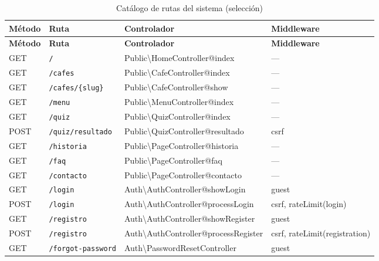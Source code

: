 \documentclass[12pt,a4paper,twoside,openright]{report}
\begin{document}
\begin{landscape}
\begin{longtable}{@{}llll@{}}
  \caption{Catálogo de rutas del sistema (selección)}
  \label{tab:rutas}\\
  \toprule
  \textbf{Método} & \textbf{Ruta} & \textbf{Controlador} & \textbf{Middleware}\\
  \midrule
  \endfirsthead
  \toprule
  \textbf{Método} & \textbf{Ruta} & \textbf{Controlador} & \textbf{Middleware}\\
  \midrule
  \endhead
  \bottomrule
  \endfoot
  GET  & \texttt{/}                    & Public\textbackslash HomeController@index          & —\\
  GET  & \texttt{/cafes}               & Public\textbackslash CafeController@index          & —\\
  GET  & \texttt{/cafes/\{slug\}}      & Public\textbackslash CafeController@show           & —\\
  GET  & \texttt{/menu}                & Public\textbackslash MenuController@index          & —\\
  GET  & \texttt{/quiz}                & Public\textbackslash QuizController@index          & —\\
  POST & \texttt{/quiz/resultado}      & Public\textbackslash QuizController@resultado      & csrf\\
  GET  & \texttt{/historia}            & Public\textbackslash PageController@historia       & —\\
  GET  & \texttt{/faq}                 & Public\textbackslash PageController@faq            & —\\
  GET  & \texttt{/contacto}            & Public\textbackslash PageController@contacto       & —\\
  GET  & \texttt{/login}               & Auth\textbackslash AuthController@showLogin         & guest\\
  POST & \texttt{/login}               & Auth\textbackslash AuthController@processLogin      & csrf, rateLimit(login)\\
  GET  & \texttt{/registro}            & Auth\textbackslash AuthController@showRegister      & guest\\
  POST & \texttt{/registro}            & Auth\textbackslash AuthController@processRegister   & csrf, rateLimit(registration)\\
  GET  & \texttt{/forgot-password}     & Auth\textbackslash PasswordResetController         & guest\\

\end{longtable}
\end{landscape}
\end{document}

